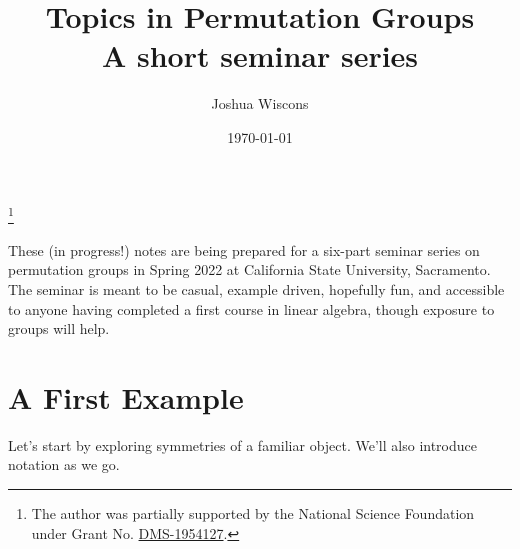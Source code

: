 \documentclass[11pt]{amsart}
\theoremstyle{plain}
\theoremstyle{definition}
\theoremstyle{remark}
\begin{document}
\title[Permutation Groups]{Topics in Permutation Groups\\[7pt] {\footnotesize A short seminar series}}
\author{Joshua Wiscons}
\address{Department of Mathematics and Statistics\\
California State University, Sacramento\\
Sacramento, CA 95819, USA}
\date{\today}
\thanks{The author was partially supported by the National Science Foundation under Grant No. \href{https://www.nsf.gov/awardsearch/showAward?AWD_ID=1954127}{DMS-1954127}.}

\maketitle

\tableofcontents

These (in progress!) notes are being prepared for a six-part seminar series on permutation groups in Spring 2022 at California State University, Sacramento. The seminar is meant to be casual, example driven, hopefully fun, and accessible to anyone having completed a first course in linear algebra, though exposure to groups will help. 

\newpage
\section{A First Example}\label{S:first.example}
Let's start by exploring symmetries of a familiar object. We'll also introduce notation as we go.
\end{document}
